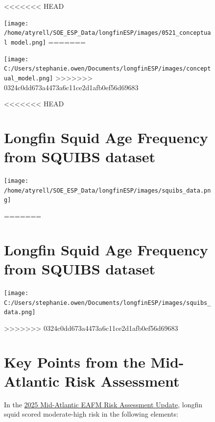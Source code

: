 \documentclass[
<<<<<<< HEAD
  8.5pt,
  letterpaper,
]{article}
\begin{document}
\begin{figure}
\begin{minipage}[t]{0.57\linewidth}
{<<<<<<< HEAD
\vspace{1.0cm}

\texttt{[image: /home/atyrell/SOE\_ESP\_Data/longfinESP/images/0521\_conceptual model.png]}
=======
\vspace{0.5cm}

\texttt{[image: C:/Users/stephanie.owen/Documents/longfinESP/images/conceptual\_model.png]}
>>>>>>> 0324c0dd673a4473a6c11ce2d1afb0ef56d69683

}

\end{minipage}%
%
\begin{minipage}[t]{0.03\linewidth}

{\centering 

\hfill

}

\end{minipage}%
%
\begin{minipage}[t]{0.40\linewidth}

{\centering 

<<<<<<< HEAD
\section{Longfin Squid Age Frequency from SQUIBS dataset}

\texttt{[image: /home/atyrell/SOE\_ESP\_Data/longfinESP/images/squibs\_data.png]}

\vspace{1.0cm}
=======
\vspace{0.5cm}
\section{Longfin Squid Age Frequency from SQUIBS dataset}

\texttt{[image: C:/Users/stephanie.owen/Documents/longfinESP/images/squibs\_data.png]}

\vspace{0.25cm}
>>>>>>> 0324c0dd673a4473a6c11ce2d1afb0ef56d69683

\section{Key Points from the Mid-Atlantic Risk Assessment}

\raggedright

In the
\href{https://static1.squarespace.com/static/511cdc7fe4b00307a2628ac6/t/67d45b1680e8654ecaf1b98e/1741970199497/b_Draft+MAB_RiskAssess_2025.pdf}{2025
Mid-Atlantic EAFM Risk Assessment Update}, longfin squid scored
moderate-high risk in the following elements:

}
\end{minipage}
\end{figure}
\end{document}
